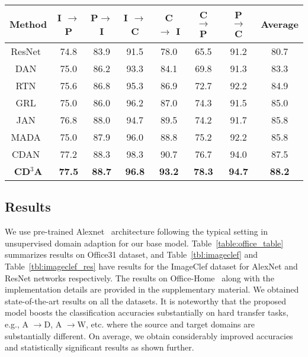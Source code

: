 \documentclass{bmvc2k}
\begin{document}
\begin{table*}[!]
\centering
\begin{tabular}{|c|c|c|c|c|c|c|c|}
 \hline
  \textbf{Method }& I $\rightarrow$ P & P$\rightarrow$ I &  I $\rightarrow$ C &C $\rightarrow$ I & C $\rightarrow$ P & P $\rightarrow$ C & Average \\ 
  \hline
ResNet~\cite{he2016deep} & 74.8 & 83.9 & 91.5 & 78.0 & 65.5 & 91.2 & 80.7 \\
DAN~\cite{long_ICML2015} & 75.0 & 86.2 & 93.3 & 84.1 & 69.8 & 91.3 & 83.3 \\
RTN~\cite{long_NIPS2016} & 75.6 & 86.8 & 95.3 & 86.9 & 72.7 & 92.2 & 84.9 \\
GRL~\cite{ganin_ICML2015} & 75.0 & 86.0 & 96.2 & 87.0 & 74.3 & 91.5 & 85.0 \\
JAN~\cite{long_ICML2017} & 76.8 & 88.0 &94.7 & 89.5 & 74.2 & 91.7 & 85.8 \\ 
MADA~\cite{pei_arxiv2018} & 75.0 & 87.9 & {96.0} & 88.8 & 75.2 & 92.2 & 85.8 \\
CDAN~\cite{long_arxive2017conditional} & 77.2 & 88.3 & 98.3 & 90.7 & 76.7 & 94.0 & 87.5  \\
 \hline
\textbf{CD$^{3}$A} & \textbf{77.5} & \textbf{88.7} & \textbf{96.8} & \textbf{93.2} &  \textbf{78.3}  &  \textbf{94.7} & \textbf{88.2} \\
 \hline

\end{tabular}
\vspace{1em}
\caption {Classification accuracy (\%) on \textit{ImageCLEF} dataset for unsupervised domain adaptation (ResNet-50~\cite{he2016deep})\label{tbl:imageclef_res}} 

\end{table*}


\subsection{Results}




We use pre-trained Alexnet~\cite{krizhevsky_NIPS2012} architecture following the typical setting in unsupervised domain adaption for our base model. Table~\ref{table:office_table} summarizes results on Office31 dataset,
and Table~\ref{tbl:imageclef} and Table~\ref{tbl:imageclef_res} have results for the ImageClef dataset for AlexNet and ResNet networks respectively. The results on Office-Home~\cite{venkateswara_cvpr2017deep} along with the implementation details are provided in the supplementary material. We obtained state-of-the-art results on all the datasets. It is noteworthy that the proposed model boosts the classification accuracies substantially on hard transfer tasks, e.g., A $\rightarrow$D, A $\rightarrow$W, etc. where the source and target domains are substantially different. On average, we obtain considerably improved accuracies and statistically significant results as shown further.
\end{document}
